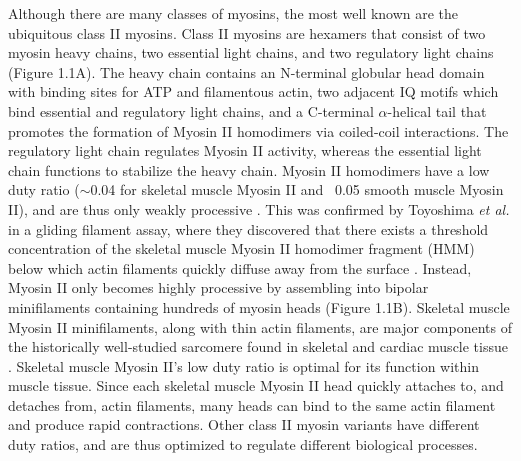 \documentclass{ucetd}
\begin{document}
Although there are many classes of myosins, the most well known are the ubiquitous class II myosins.  Class II myosins are hexamers that consist of two myosin heavy chains, two essential light chains, and two regulatory light chains (Figure 1.1A).  The heavy chain contains an N-terminal globular head domain with binding sites for ATP and filamentous actin, two adjacent IQ motifs which bind essential and regulatory light chains, and a C-terminal $\alpha$-helical tail that promotes the formation of Myosin II homodimers via coiled-coil interactions. The regulatory light chain regulates Myosin II activity, whereas the essential light chain functions to stabilize the heavy chain.  Myosin II homodimers have a low duty ratio ($\sim$0.04 for skeletal muscle Myosin II and ~0.05 smooth muscle Myosin II), and are thus only weakly processive \cite{Harris:1993tw, OConnell:2007hb}.  This was confirmed by Toyoshima \textit{et al.} in a gliding filament assay, where they discovered that there exists a threshold concentration of the skeletal muscle Myosin II homodimer fragment (HMM) below which actin filaments quickly diffuse away from the surface \cite{Toyoshima:1987kf}.  Instead, Myosin II only becomes highly processive by assembling into bipolar minifilaments containing hundreds of myosin heads (Figure 1.1B).  Skeletal muscle Myosin II minifilaments, along with thin actin filaments, are major components of the historically well-studied sarcomere found in skeletal and cardiac muscle tissue \cite{Huxley:2004he}.  Skeletal muscle Myosin II's low duty ratio is optimal for its function within muscle tissue.  Since each skeletal muscle Myosin II head quickly attaches to, and detaches from, actin filaments, many heads can bind to the same actin filament and produce rapid contractions.  Other class II myosin variants have different duty ratios, and are thus optimized to regulate different biological processes.
\end{document}
